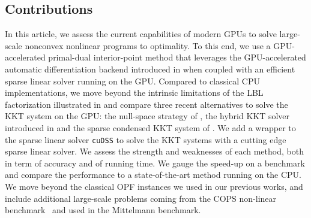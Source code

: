 \subsection{Contributions}
In this article, we assess the current capabilities of modern GPUs
to solve large-scale nonconvex nonlinear programs to optimality.
To this end, we use a GPU-accelerated primal-dual interior-point method
that leverages the GPU-accelerated automatic differentiation
backend introduced in \cite{shin2023accelerating} when coupled with
an efficient sparse linear solver running on the GPU.
Compared to classical CPU implementations,
we move beyond the intrinsic limitations of the LBL factorization
illustrated in \cite{tasseff2019exploring,swirydowicz2021linear} and
compare three recent alternatives to solve the KKT system on the GPU:
the null-space strategy of \cite{pacaud2022condensed}, the hybrid
KKT solver introduced in \cite{regev2023hykkt} and the sparse
condensed KKT system of \cite{shin2023accelerating}.
We add a wrapper to the sparse linear solver {\tt cuDSS} to solve
the KKT systems with a cutting edge sparse linear solver.
We assess the strength
and weaknesses of each method, both in term of accuracy and of running time.
We gauge the speed-up on a benchmark and compare the performance to a state-of-the-art method running
on the CPU. We move beyond the classical OPF instances we used in our previous works,
and include additional large-scale problems coming from the COPS
non-linear benchmark~\cite{dolan2004benchmarking} and used in the Mittelmann benchmark.
